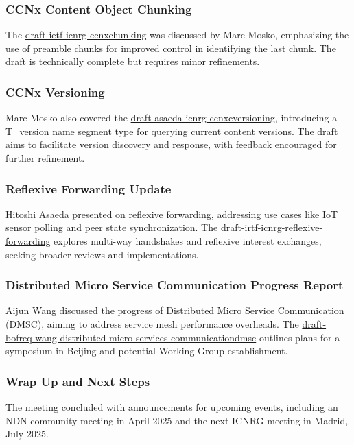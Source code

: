 \documentclass{article}
\begin{document}
\subsubsection{CCNx Content Object Chunking}
The \href{https://datatracker.ietf.org/doc/html/draft-ietf-icnrg-ccnxchunking}{draft-ietf-icnrg-ccnxchunking} was discussed by Marc Mosko, emphasizing the use of preamble chunks for improved control in identifying the last chunk. The draft is technically complete but requires minor refinements.

\subsubsection{CCNx Versioning}
Marc Mosko also covered the \href{https://datatracker.ietf.org/doc/html/draft-asaeda-icnrg-ccnxcversioning}{draft-asaeda-icnrg-ccnxcversioning}, introducing a T\_version name segment type for querying current content versions. The draft aims to facilitate version discovery and response, with feedback encouraged for further refinement.

\subsubsection{Reflexive Forwarding Update}
Hitoshi Asaeda presented on reflexive forwarding, addressing use cases like IoT sensor polling and peer state synchronization. The \href{https://datatracker.ietf.org/doc/html/draft-irtf-icnrg-reflexive-forwarding}{draft-irtf-icnrg-reflexive-forwarding} explores multi-way handshakes and reflexive interest exchanges, seeking broader reviews and implementations.

\subsubsection{Distributed Micro Service Communication Progress Report}
Aijun Wang discussed the progress of Distributed Micro Service Communication (DMSC), aiming to address service mesh performance overheads. The \href{https://datatracker.ietf.org/doc/bofreq-wang-distributed-micro-services-communicationdmsc}{draft-bofreq-wang-distributed-micro-services-communicationdmsc} outlines plans for a symposium in Beijing and potential Working Group establishment.

\subsubsection{Wrap Up and Next Steps}
The meeting concluded with announcements for upcoming events, including an NDN community meeting in April 2025 and the next ICNRG meeting in Madrid, July 2025.
\end{document}
